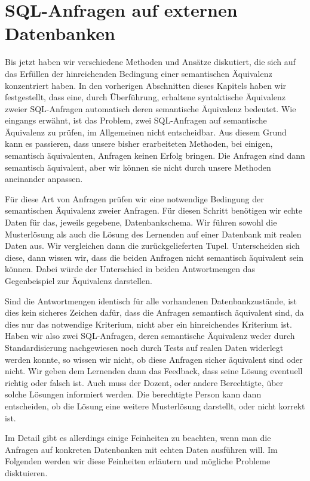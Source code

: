 \section{SQL-Anfragen auf externen Datenbanken}
\label{sec:externalDBS}

Bis jetzt haben wir verschiedene Methoden und Ansätze diskutiert, die sich auf das Erfüllen der hinreichenden Bedingung einer semantischen Äquivalenz konzentriert haben. In den vorherigen Abschnitten dieses Kapitels haben wir festgestellt, dass eine, durch Überführung, erhaltene syntaktische Äquivalenz zweier SQL-Anfragen automatisch deren semantische Äquivalenz bedeutet. Wie eingangs erwähnt, ist das Problem, zwei SQL-Anfragen auf semantische Äquivalenz zu prüfen, im Allgemeinen nicht entscheidbar. Aus diesem Grund kann es passieren, dass unsere bisher erarbeiteten Methoden, bei einigen, semantisch äquivalenten, Anfragen keinen Erfolg bringen. Die Anfragen sind dann semantisch äquivalent, aber wir können sie nicht durch unsere Methoden aneinander anpassen. 

Für diese Art von Anfragen prüfen wir eine notwendige Bedingung der semantischen Äquivalenz zweier Anfragen. Für diesen Schritt benötigen wir echte Daten für das, jeweils gegebene, Datenbankschema. Wir führen sowohl die Musterlösung als auch die Lösung des Lernenden auf einer Datenbank mit realen Daten aus. Wir vergleichen dann die zurückgelieferten Tupel. Unterscheiden sich diese, dann wissen wir, dass die beiden Anfragen nicht semantisch äquivalent sein können. Dabei würde der Unterschied in beiden Antwortmengen das Gegenbeispiel zur Äquivalenz darstellen.

Sind die Antwortmengen identisch für alle vorhandenen Datenbankzustände, ist dies kein sicheres Zeichen dafür, dass die Anfragen semantisch äquivalent sind, da dies nur das notwendige Kriterium, nicht aber ein hinreichendes Kriterium ist. Haben wir also zwei SQL-Anfragen, deren semantische Äquivalenz weder durch Standardisierung nachgewiesen noch durch Tests auf realen Daten widerlegt werden konnte, so wissen wir nicht, ob diese Anfragen sicher äquivalent sind oder nicht. Wir geben dem Lernenden dann das Feedback, dass seine Lösung eventuell richtig oder falsch ist. Auch muss der Dozent, oder andere Berechtigte, über solche Lösungen informiert werden. Die berechtigte Person kann dann entscheiden, ob die Lösung eine weitere Musterlösung darstellt, oder nicht korrekt ist.

Im Detail gibt es allerdings einige Feinheiten zu beachten, wenn man die Anfragen auf konkreten Datenbanken mit echten Daten ausführen will. Im Folgenden werden wir diese Feinheiten erläutern und mögliche Probleme disktuieren.

